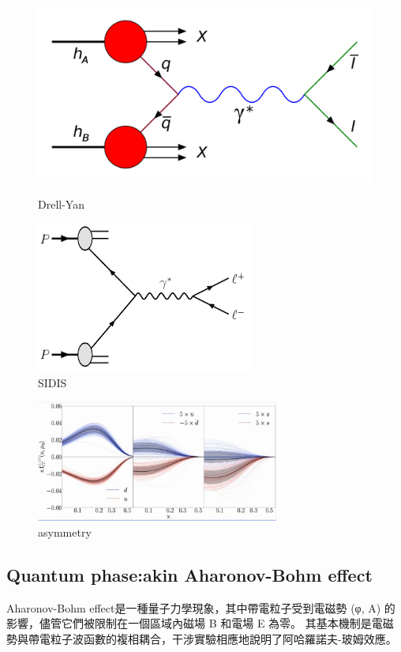 \documentclass[12pt, a4paper, oneside]{ctexart}
\begin{document}
\begin{spacing}{2.0}
\begin{figure}
    \begin{minipage}[t]{0.5\linewidth}
        \centering
        \includegraphics[scale=0.1]{drellyan.png}
        \caption{Drell-Yan}
        \label{fig:side:a}
      \end{minipage}%
      \begin{minipage}[t]{0.5\linewidth}
        \centering
        \includegraphics[scale=0.3]{SIDIS.png}
        \caption{SIDIS}
        \label{fig:side:b}
      \end{minipage}
\end{figure}
\begin{figure}
    \centering
    \includegraphics[width=8cm]{theta.jpg}
    \caption{asymmetry}    
\end{figure}


\subsection{Quantum phase:akin Aharonov-Bohm effect}
Aharonov-Bohm effect是一種量子力學現象，其中帶電粒子受到電磁勢 (φ, A) 的影響，儘管它們被限制在一個區域內磁場 B 和電場 E 為零。
其基本機制是電磁勢與帶電粒子波函數的複相耦合，干涉實驗相應地說明了阿哈羅諾夫-玻姆效應。


\end{spacing}
\end{document}
